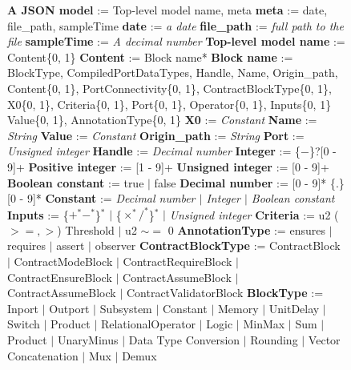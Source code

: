 \documentclass{article}
\begin{document}
\begin{figure}
\begin{algorithmic}
\State \textbf{A JSON model} := Top-level model name, meta
\State \textbf{meta} := date, file\_path, sampleTime
\State \textbf{date} := \textit{a date}
\State \textbf{file\_path} := \textit{full path to the file}
\State \textbf{sampleTime} := \textit{A decimal number}
\State \textbf{Top-level model name} := Content\{0, 1\}
\State \textbf{Content} := Block name*
\State \textbf{Block name} := BlockType, CompiledPortDataTypes, Handle, Name, Origin\_path,  
\State {\ \ \ \ \ \ \ \ \ \ \ \ \ \ \ \ \ \ \ \ \ \ }Content\{0, 1\}, PortConnectivity\{0, 1\}, ContractBlockType\{0, 1\}, 
\State {\ \ \ \ \ \ \ \ \ \ \ \ \ \ \ \ \ \ \ \ \ \ }X0\{0, 1\}, Criteria\{0, 1\}, Port\{0, 1\}, Operator\{0, 1\}, Inputs\{0, 1\}
\State {\ \ \ \ \ \ \ \ \ \ \ \ \ \ \ \ \ \ \ \ \ \ }Value\{0, 1\}, AnnotationType\{0, 1\}
\State \textbf{X0} := \textit{Constant}
\State \textbf{Name} := \textit{String}
\State \textbf{Value} := \textit{Constant}
\State \textbf{Origin\_path} := \textit{String}
\State \textbf{Port} := \textit{Unsigned integer}
\State \textbf{Handle} := \textit{Decimal number}
\State \textbf{Integer} := \{$-$\}?[0 - 9]+
\State \textbf{Positive integer} := [1 - 9]+
\State \textbf{Unsigned integer} := [0 - 9]+
\State \textbf{Boolean constant} := true $\mid$ false 
\State \textbf{Decimal number} := [0 - 9]* \{.\} [0 - 9]*
\State \textbf{Constant} := \textit{Decimal number $\mid$ Integer $\mid$ Boolean constant}
\State \textbf{Inputs} := \{$+^*-^*$\}$^*$ $\mid$ \{$\times^* /^*$\}$^*$ $\mid$ \textit{Unsigned integer}
\State \textbf{Criteria} := u2 ($>=, >$) Threshold $\mid$ u2 $\sim =$ 0
\State \textbf{AnnotationType} := ensures $\mid$ requires $\mid$ assert $\mid$ observer
\State \textbf{ContractBlockType} := ContractBlock $\mid$ ContractModeBlock $\mid$ ContractRequireBlock 
\State {\ \ \ \ \ \ \ \ \ \ \ \ \ \ \ \ \ \ \ \ \ \ \ \ \ \ \ \ \ \ \ \ \ } $\mid$ ContractEnsureBlock  $\mid$ ContractAssumeBlock $\mid$ ContractAssumeBlock 
\State {\ \ \ \ \ \ \ \ \ \ \ \ \ \ \ \ \ \ \ \ \ \ \ \ \ \ \ \ \ \ \ \ \ } $\mid$ ContractValidatorBlock
\State \textbf{BlockType} := Inport $\mid$ Outport $\mid$ Subsystem $\mid$ Constant $\mid$ Memory $\mid$ UnitDelay $\mid$ Switch $\mid$ Product 
\State {\ \ \ \ \ \ \ \ \ \ \ \ \ \ \ \ \ \ \ \ } $\mid$ RelationalOperator $\mid$ Logic $\mid$ MinMax $\mid$ Sum $\mid$ Product $\mid$ UnaryMinus 
\State {\ \ \ \ \ \ \ \ \ \ \ \ \ \ \ \ \ \ \ \ } $\mid$ Data Type Conversion $\mid$ Rounding $\mid$ Vector Concatenation $\mid$ Mux $\mid$ Demux

\end{algorithmic}
\end{figure}
\end{document}
